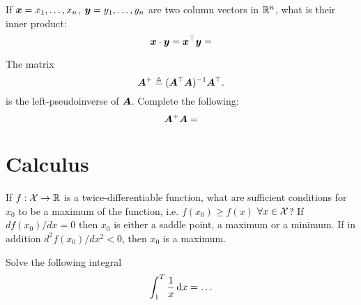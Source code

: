 \documentclass[a4paper]{article}
\begin{document}
\begin{exercise}
  If $\bx = x_1, \ldots, x_n$, $\by = y_1, \ldots, y_n$ are two column vectors in ${\mathbb{R}}^n$, what is their inner product:
  \[
  \bx \cdot \by = \bx^\top \by = 
  \ifdefined \solution
  \sum_{i=1}^n x_i y_i
  \fi
  \]
\end{exercise}

\begin{exercise}
  The matrix 
  \[
  \MA^+ \defn (\MA^\top \MA)^{-1} \MA^\top.
  \]
  is the left-pseudoinverse of $\MA$. Complete the following:
  \[
  \MA^+ \MA =
  \ifdefined \solution
  (\MA^\top \MA)^{-1} \MA^\top \MA
  = 
  \eye
  \fi
  \]
\end{exercise}


\section{Calculus}

\begin{exercise}
  If $f : {\mathcal{X}} \to {\mathbb{R}}$ is a twice-differentiable function, what are sufficient conditions for $x_0$ to be a maximum of the function, i.e. $f(x_0) \geq f(x)$ $\forall x \in {\mathcal{X}}$?
  \ifdefined\solution
  If $d f(x_0) /dx  = 0$ then
  $x_0$ is either a saddle point, a maximum or a minimum. If in addition $d^2 f(x_0) /dx^2 < 0$, then $x_0$ is a maximum.
  \fi
\end{exercise}

\begin{exercise}
  Solve the following integral
  \[
  \int_{1}^T \frac{1}{x} \dd x =
  \ifdefined\solution
  \ln T
  \else 
  \ldots
  \fi
  \]
\end{exercise}
\end{document}
